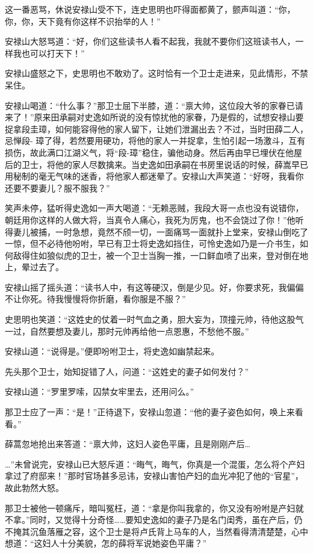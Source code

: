 \documentclass[12pt,oneside]{book}
\begin{document}
这一番恶骂，休说安禄山受不下，连史思明也吓得面都黄了，颤声叫道：``你，你，你，天下竟有你这样不识抬举的人！''

安禄山大怒骂道：``好，你们这些读书人看不起我，我就不要你们这班读书人，一样我也可以打天下！''

安禄山盛怒之下，史思明也不敢劝了。这时恰有一个卫士走进来，见此情形，不禁呆住。

安禄山喝道：``什么事？''那卫士屈下半膝，道：``禀大帅，这位段大爷的家眷已请来了！''原来田承嗣对史逸如所说的没有惊扰他的家眷，乃是假的，试想安禄山要捉拿段圭璋，如何能容得他的家人留下，让她们泄漏出去？不过，当时田薛二人，忌惮段-
璋了得，若然要用硬功，将他的家人一并捉拿，生怕引起一场激斗，互有损伤，故此满口江湖义气，将``段-璋''稳住，骗他动身。然后再由早已埋伏在他屋后的卫士，将他的家人尽数擒来。当史逸如田承嗣在书房里说话的时候，薛嵩早已用秘制的毫无气味的迷香，将他家人都迷晕了。安禄山大声笑道：``好呀，我看你还要不要妻儿？服不服我？''

笑声未停，猛听得史逸如一声大喝道：``无赖恶贼，我段大哥一点也没有说错你，朝廷用你这样的人做大将，当真令人痛心，我死为厉鬼，也不会饶过了你！''他听得妻儿被捕，一时急想，竟然不颀一切，一面痛骂一面就扑上堂来，安禄山倒吃了一惊，但不必待他吩咐，早已有卫士将史逸如挡住，可怜史逸如乃是一介书生，如何敌得住如狼似虎的卫士，被一个卫士当胸一推，一口鲜血喷了出来，登对倒在地上，晕过去了。

安禄山摇了摇头道：``读书人中，有这等硬汉，倒是少见。好，你要求死，我偏偏不让你死。待我慢慢将你折磨，看你服是不服？''

史思明也笑道：``这姓史的仗着一时气血之勇，胆大妄为，顶撞元帅，待他这股气一过，自然要想及妻儿，那时元帅再给他一点恩惠，不愁他不服。''

安禄山道：``说得是。''便即吩咐卫士，将史逸如幽禁起来。

先头那个卫士，始知捉错了人，问道：``这姓史的妻子如何发付？''

安禄山道：``罗里罗嗦，囚禁女牢里去，还用问么。''

那卫士应了一声：``是！''正待退下，安禄山忽道：``他的妻子姿色如何，唤上来看看。''

薛蒿忽地抢出来答道：``禀大帅，这妇人姿色平庸，且是刚刚产后\ldots{}

\ldots''未曾说完，安禄山已大怒斥道：``晦气，晦气，你真是一个混蛋，怎么将个产妇拿过了府邸来！''那时官场甚多忌讳，安禄山害怕产妇的血光冲犯了他的``官星''，故此勃然大怒。

那卫士被他一顿痛斥，暗叫冤枉，道：``拿是你叫我拿的，你又没有吩咐是产妇就不拿。''同时，又觉得十分奇怪\ldots\ldots 要知史逸如的妻子乃是名门闺秀，虽在产后，仍不掩其沉鱼落雁之容，这个卫士是将卢氏背上马车的人，当然看得清清楚楚，心中想道：``这妇人十分美貌，怎的薛将军说她姿色平庸？''
\end{document}
